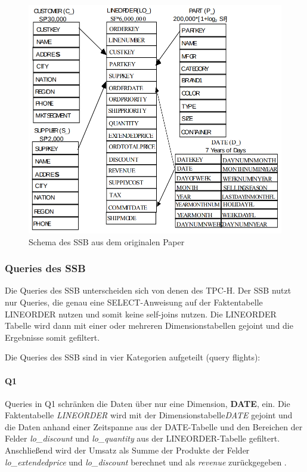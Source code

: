 \begin{figure}[ht]  %
    \centering      %
    \includegraphics[width=1\textwidth]{pictures/ssb/ssb-schema.png}
    \caption{Schema des \ac{SSB} aus dem originalen Paper~\cite{oneil_star_2009}}      %
    \label{pic:ssb-schema}    %
\end{figure}


\subsubsection{Queries des \ac{SSB}}
Die Queries des \ac{SSB} unterscheiden sich von denen des \ac{TPC-H}.
Der \ac{SSB} nutzt nur Queries, die genau eine SELECT-Anweisung auf der Faktentabelle LINEORDER nutzen und somit keine self-joins nutzen. %
Die LINEORDER Tabelle wird dann mit einer oder mehreren Dimensionstabellen gejoint und die Ergebnisse somit gefiltert. 

Die Queries des \ac{SSB} sind in vier Kategorien aufgeteilt (query flights): %


\paragraph{Q1}
Queries in Q1 schränken die Daten über nur eine Dimension, \textbf{DATE}, ein.
Die Faktentabelle \emph{LINEORDER} wird mit der Dimensionstabelle\emph{DATE} gejoint und die Daten anhand einer Zeitspanne aus der DATE-Tabelle und den Bereichen der Felder \emph{lo\_discount} und \emph{lo\_quantity} aus der LINEORDER-Tabelle gefiltert.
Anschließend wird der Umsatz als Summe der Produkte der Felder \emph{lo\_extendedprice} und \emph{lo\_discount} berechnet und als \emph{revenue} zurückgegeben \cite{oneil_star_2009}.


